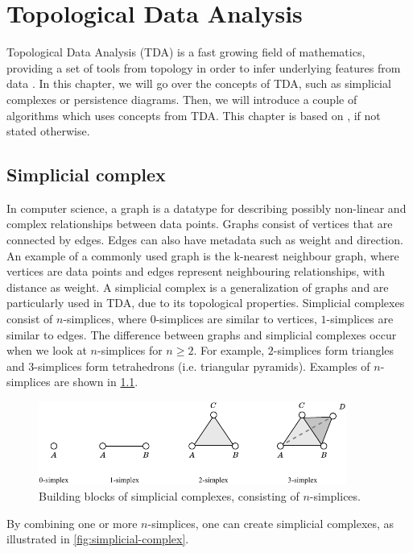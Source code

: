 \chapter{Topological Data Analysis}
Topological Data Analysis (TDA) is a fast growing field of mathematics, providing a set of tools from topology in order to infer underlying features from data \cite{chazal2021introduction}. In this chapter, we will go over the concepts of TDA, such as simplicial complexes or persistence diagrams. Then, we will introduce a couple of algorithms which uses concepts from TDA. This chapter is based on \cites{Edelsbrunner2010}{chazal2021introduction}, if not stated otherwise.

\section{Simplicial complex}
In computer science, a graph is a datatype for describing possibly non-linear and complex relationships between data points. Graphs consist of vertices that are connected by edges. Edges can also have metadata such as weight and direction. An example of a commonly used graph is the k-nearest neighbour graph, where vertices are data points and edges represent neighbouring relationships, with distance as weight. A simplicial complex is a generalization of graphs and are particularly used in TDA, due to its topological properties. Simplicial complexes consist of $n$-simplices, where $0$-simplices are similar to vertices, $1$-simplices are similar to edges. The difference between graphs and simplicial complexes occur when we look at $n$-simplices for $n \geq 2$. For example, $2$-simplices form triangles and $3$-simplices form tetrahedrons (i.e. triangular pyramids). Examples of $n$-simplices are shown in \cref{fig:n-simplices-example}.
\begin{figure}[H]
    \centering
    \includegraphics[width=0.9\textwidth]{thesis/figures/n-simplices_cropped.pdf}
    \caption{Building blocks of simplicial complexes, consisting of $n$-simplices.}
    \label{fig:n-simplices-example}
\end{figure}
By combining one or more $n$-simplices, one can create simplicial complexes, as illustrated in \cref{fig:simplicial-complex}.
